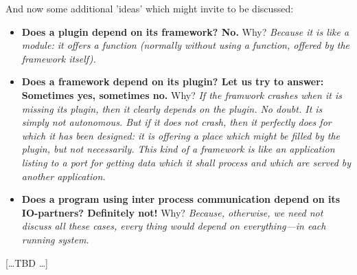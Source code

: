 {And now some additional 'ideas' which might invite to be discussed:

\begin{itemize}
  \item \textbf{Does a plugin depend on its framework? No.} Why? \emph{
  Because it is like a module: it offers a function (normally without using
  a function, offered by the framework itself).}
  \item \textbf{Does a framework depend on its plugin? Let us try to answer:
  Sometimes yes, sometimes no.} Why? \emph{If the framwork crashes when it is
  missing its plugin, then it clearly depends on the plugin. No doubt. It is
  simply not autonomous. But if it does not crash, then it perfectly does for
  which it has been designed: it is offering a place which might be filled by
  the plugin, but not necessarily. This kind of a framework is like an
  application listing to a port for getting data which it shall process and
  which are served by another application.}
  \item \textbf{Does a program using inter process communication depend on its
  IO-partners? Definitely not!} Why? \emph{Because, otherwise, we need not discuss
  all these cases, every thing would depend on everything---in each running system.}
\end{itemize}

[\ldots TBD \ldots]

}
%

